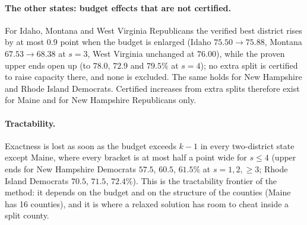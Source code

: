 \paragraph{The other states: budget effects that are not certified.}
For Idaho, Montana and West Virginia Republicans the verified best district rises by at most 0.9 point when the budget is enlarged (Idaho $75.50\to75.88$, Montana $67.53\to68.38$ at $s=3$, West Virginia unchanged at $76.00$), while the proven upper ends open up (to $78.0$, $72.9$ and $79.5\%$ at $s=4$); no extra split is certified to raise capacity there, and none is excluded. The same holds for New Hampshire and Rhode Island Democrats. Certified increases from extra splits therefore exist for Maine and for New Hampshire Republicans only.

\paragraph{Tractability.}
Exactness is lost as soon as the budget exceeds $k-1$ in every two-district state except Maine, where every bracket is at most half a point wide for $s\le4$ (upper ends for New Hampshire Democrats $57.5$, $60.5$, $61.5\%$ at $s=1,2,\ge3$; Rhode Island Democrats $70.5$, $71.5$, $72.4\%$). This is the tractability frontier of the method: it depends on the budget and on the structure of the counties (Maine has 16 counties), and it is where a relaxed solution has room to cheat inside a split county.
